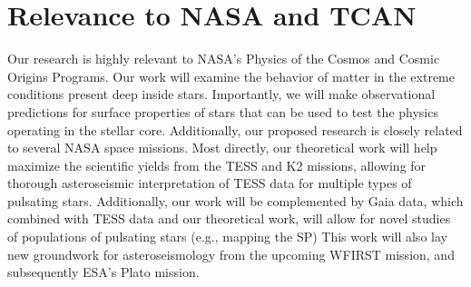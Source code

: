 {\color{orange}

\section{Relevance to NASA and TCAN}



Our research is highly relevant to NASA's Physics of the Cosmos and Cosmic Origins Programs. Our work will examine the behavior of matter in the extreme conditions present deep inside stars. Importantly, we will make observational predictions for surface properties of stars that can be used to test the physics operating in the stellar core. Additionally, our proposed research is closely related to several NASA space missions. Most directly, our theoretical work will help maximize the scientific yields from the TESS and K2 missions, allowing for thorough asteroseismic interpretation of TESS data for multiple types of pulsating stars. Additionally, our work will be complemented by Gaia data, which combined with TESS data and our theoretical work, will allow for novel studies of populations of pulsating stars (e.g., mapping the SP) This work will also lay new groundwork for asteroseismology from the upcoming WFIRST mission, and subsequently ESA's Plato mission. 


}